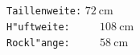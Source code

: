 \documentclass{scrartcl}
\begin{document}
\\ \mbox{}\\
\flushleft
\noindent \mbox{} \hspace{1cm} \texttt{Taillenweite:} $ \SI{72}{\centi\meter} $ \\
\mbox{} \hspace{1cm} \texttt{H"uftweite:} ~~~~ $ \SI{108}{\centi\meter}$ \\
\mbox{} \hspace{1cm} \texttt{Rockl"ange:} ~~~~ $ \SI{58}{\centi\meter} $ 
\end{document}
